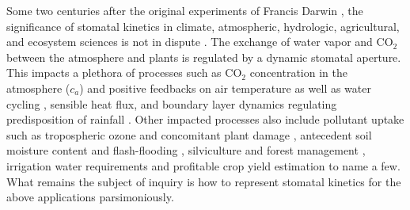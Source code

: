 \documentclass[utf8]{frontiersSCNS} %
\begin{document}
Some two centuries after the original experiments of Francis Darwin \citep{darwin1898ix,scarth1927stomatal}, the significance of stomatal kinetics in climate, atmospheric, hydrologic, agricultural, and ecosystem sciences is not in dispute \citep{hetherington2003role}.  The exchange of water vapor and CO$_2$ between the atmosphere and plants is regulated by a dynamic stomatal aperture. This impacts a plethora of processes such as CO$_2$ concentration in the atmosphere ($c_a$) and positive feedbacks on air temperature \citep{cox2000acceleration} as well as water cycling \citep{betts2007projected,katul2012evapotranspiration}, sensible heat flux, and boundary layer dynamics regulating predisposition of rainfall \citep{siqueira2009soil, manoli2016soil}. Other impacted processes also include pollutant uptake such as tropospheric ozone and concomitant plant damage \citep{rich1964ozone,musselman2006critical}, antecedent soil moisture content and flash-flooding \citep{javelle2010flash}, silviculture and forest management \citep{makela1986stand}, irrigation water requirements and profitable crop yield estimation \citep{vico2015ecohydrology} to name a few.  What remains the subject of inquiry is how to represent stomatal kinetics for the above applications parsimoniously. 
\end{document}
